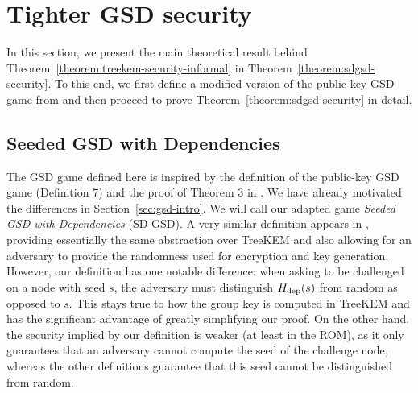 \section{Tighter GSD security} \label{sec:tighter-gsd-security}

In this section, we present the main theoretical result behind Theorem~\ref{theorem:treekem-security-informal} in Theorem~\ref{theorem:sdgsd-security}. To this end, we first define a modified version of the public-key GSD game from \cite{ttkem} and then proceed to prove Theorem~\ref{theorem:sdgsd-security} in detail.

\subsection{Seeded GSD with Dependencies} \label{sec:sd-gsd-game}

The GSD game defined here is inspired by the definition of the public-key GSD game (Definition 7) and the proof of Theorem 3 in \cite{ttkem}. We have already motivated the differences in Section~\ref{sec:gsd-intro}. We will call our adapted game \emph{Seeded GSD with Dependencies} (SD-GSD). A very similar definition appears in \cite{modular-group-messaging}, providing essentially the same abstraction over TreeKEM and also allowing for an adversary to provide the randomness used for encryption and key generation. However, our definition has one notable difference: when asking to be challenged on a node with seed $s$, the adversary must distinguish $H_\mathrm{dep}(s)$ from random as opposed to $s$. This stays true to how the group key is computed in TreeKEM and has the significant advantage of greatly simplifying our proof. On the other hand, the security implied by our definition is weaker (at least in the ROM), as it only guarantees that an adversary cannot compute the seed of the challenge node, whereas the other definitions guarantee that this seed cannot be distinguished from random.


